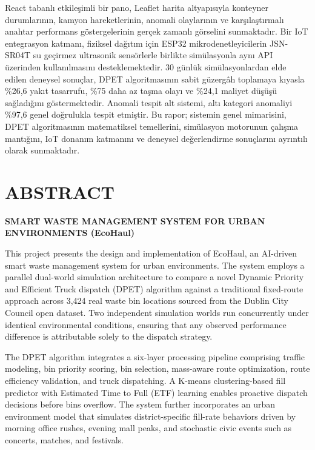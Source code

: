 \documentclass[12pt,a4paper]{report}
\begin{document}
\indent React tabanlı etkileşimli bir pano, Leaflet harita altyapısıyla konteyner durumlarının, kamyon hareketlerinin, anomali olaylarının ve karşılaştırmalı anahtar performans göstergelerinin gerçek zamanlı görselini sunmaktadır. Bir IoT entegrasyon katmanı, fiziksel dağıtım için ESP32 mikrodenetleyicilerin JSN-SR04T su geçirmez ultrasonik sensörlerle birlikte simülasyonla aynı API üzerinden kullanılmasını desteklemektedir. 30 günlük simülasyonlardan elde edilen deneysel sonuçlar, DPET algoritmasının sabit güzergâh toplamaya kıyasla \%26,6 yakıt tasarrufu, \%75 daha az taşma olayı ve \%24,1 maliyet düşüşü sağladığını göstermektedir. Anomali tespit alt sistemi, altı kategori anomaliyi \%97,6 genel doğrulukla tespit etmiştir. Bu rapor; sistemin genel mimarisini, DPET algoritmasının matematiksel temellerini, simülasyon motorunun çalışma mantığını, IoT donanım katmanını ve deneysel değerlendirme sonuçlarını ayrıntılı olarak sunmaktadır.

\clearpage

\chapter*{ABSTRACT}

\begin{center}
{\large\bfseries SMART WASTE MANAGEMENT SYSTEM FOR URBAN ENVIRONMENTS (EcoHaul)}
\end{center}
\vspace{0.8cm}

\indent This project presents the design and implementation of EcoHaul, an AI-driven smart waste management system for urban environments. The system employs a parallel dual-world simulation architecture to compare a novel Dynamic Priority and Efficient Truck dispatch (DPET) algorithm against a traditional fixed-route approach across 3,424 real waste bin locations sourced from the Dublin City Council open dataset. Two independent simulation worlds run concurrently under identical environmental conditions, ensuring that any observed performance difference is attributable solely to the dispatch strategy.

\indent The DPET algorithm integrates a six-layer processing pipeline comprising traffic modeling, bin priority scoring, bin selection, mass-aware route optimization, route efficiency validation, and truck dispatching. A K-means clustering-based fill predictor with Estimated Time to Full (ETF) learning enables proactive dispatch decisions before bins overflow. The system further incorporates an urban environment model that simulates district-specific fill-rate behaviors driven by morning office rushes, evening mall peaks, and stochastic civic events such as concerts, matches, and festivals.
\end{document}
